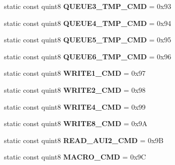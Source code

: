 \begin{DoxyCompactItemize}
\item 
\mbox{\label{class_n_c_e_message_a6c43dadbff52e1e3fb6479e61c66e4c9}} 
static const quint8 {\bfseries Q\+U\+E\+U\+E3\+\_\+\+T\+M\+P\+\_\+\+C\+MD} = 0x93
\item 
\mbox{\label{class_n_c_e_message_a2ff53743ba857c2c553826c3957f6b5b}} 
static const quint8 {\bfseries Q\+U\+E\+U\+E4\+\_\+\+T\+M\+P\+\_\+\+C\+MD} = 0x94
\item 
\mbox{\label{class_n_c_e_message_ac0ea933cb703bcf2cecb6b27f1cc7cb1}} 
static const quint8 {\bfseries Q\+U\+E\+U\+E5\+\_\+\+T\+M\+P\+\_\+\+C\+MD} = 0x95
\item 
\mbox{\label{class_n_c_e_message_a6999178dbc500063b49b8aaf73002463}} 
static const quint8 {\bfseries Q\+U\+E\+U\+E6\+\_\+\+T\+M\+P\+\_\+\+C\+MD} = 0x96
\item 
\mbox{\label{class_n_c_e_message_a98b59cb78ec56c4364022fe48249d94d}} 
static const quint8 {\bfseries W\+R\+I\+T\+E1\+\_\+\+C\+MD} = 0x97
\item 
\mbox{\label{class_n_c_e_message_a7445ba7da027255122119e7ebb37e555}} 
static const quint8 {\bfseries W\+R\+I\+T\+E2\+\_\+\+C\+MD} = 0x98
\item 
\mbox{\label{class_n_c_e_message_aa225fee33656d6aadb3b8433d6dc99b0}} 
static const quint8 {\bfseries W\+R\+I\+T\+E4\+\_\+\+C\+MD} = 0x99
\item 
\mbox{\label{class_n_c_e_message_a695185072db8e9ffb5e3848797b95279}} 
static const quint8 {\bfseries W\+R\+I\+T\+E8\+\_\+\+C\+MD} = 0x9A
\item 
\mbox{\label{class_n_c_e_message_a25796c4fe42b55087a5b140eb9c26072}} 
static const quint8 {\bfseries R\+E\+A\+D\+\_\+\+A\+U\+I2\+\_\+\+C\+MD} = 0x9B
\item 
\mbox{\label{class_n_c_e_message_aab64ec8de81639f0b67d1dae3ce8d420}} 
static const quint8 {\bfseries M\+A\+C\+R\+O\+\_\+\+C\+MD} = 0x9C
\item 

\end{DoxyCompactItemize}
